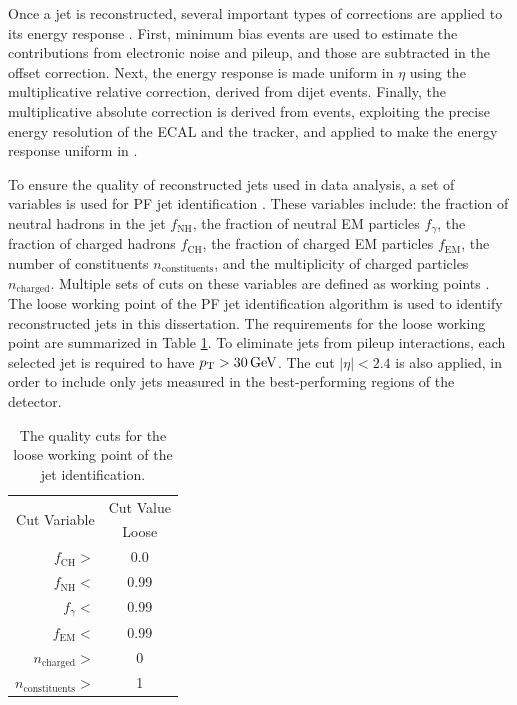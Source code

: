 Once a jet is reconstructed, several important types of corrections are applied to its energy response \cite{CMS-JEC}. First, minimum bias events are used to estimate the contributions from electronic noise and pileup, and those are subtracted in the offset correction. Next, the energy response is made uniform in $\eta$ using the multiplicative relative correction, derived from dijet events. Finally, the multiplicative absolute correction is derived from \GZJ events, exploiting the precise energy resolution of the ECAL and the tracker, and applied to make the energy response uniform in \pt.

To ensure the quality of reconstructed jets used in data analysis, a set of variables is used for PF jet identification \cite{CMS-AN-2010-003}. These variables include: the fraction of neutral hadrons in the jet $f_{\text{NH}}$, the fraction of neutral EM particles $f_{\gamma}$, the fraction of charged hadrons $f_{\text{CH}}$, the fraction of charged EM particles $f_{\text{EM}}$, the number of constituents $n_{\text{constituents}}$, and the multiplicity of charged particles $n_{\text{charged}}$. Multiple sets of cuts on these variables are defined as working points \cite{PFJetID}. The loose working point of the PF jet identification algorithm is used to identify reconstructed jets in this dissertation. The requirements for the loose working point are summarized in Table \ref{tab:jetWP}. To eliminate jets from pileup interactions, each selected jet is required to have $p_{\mathrm{T}}>30\,\text{Ge\hspace{-.08em}V}$. The cut $|\eta|<2.4$ is also applied, in order to include only jets measured in the best-performing regions of the detector.

\begin{table}[htb]
  \begin{center}
    \begin{tabular}{|r|c|}
      \hline
      \multirow{2}{*}{Cut Variable} & Cut Value \\
      \cline{2-2}
                                    & Loose \\
      \hline
      $f_{\text{CH}}>$              & 0.0 \\
      $f_{\text{NH}}<$              & 0.99 \\
      $f_{\gamma}<$                 & 0.99 \\
      $f_{\text{EM}}<$              & 0.99 \\
      $n_{\text{charged}}>$         & 0 \\
      $n_{\text{constituents}}>$    & 1 \\
      \hline
    \end{tabular}
    \caption{The quality cuts for the loose working point of the jet identification. }
    \label{tab:jetWP}
  \end{center}
\end{table}

